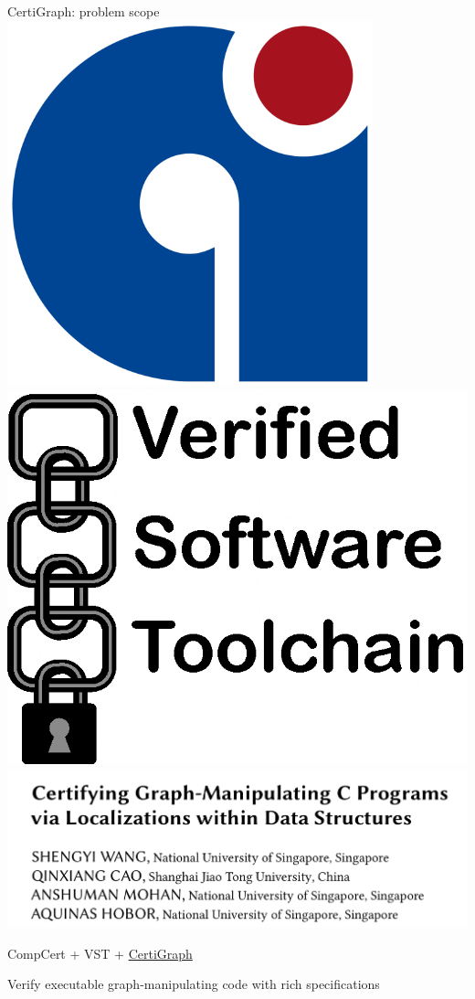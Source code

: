 \documentclass[usenames, xcolor=dvipsnames]{beamer}
\begin{document}
\begin{frame}{CertiGraph: problem scope}
\includegraphics[scale=0.12]{compcert_logo}
\hspace{2em} \includegraphics[scale=0.09]{vst_logo}
\hspace{2em} \includegraphics[scale=0.2]{paper_screen}

\bigskip
CompCert + VST + \underline{CertiGraph}

\bigskip

\pause

Verify executable graph-manipulating code with rich specifications

\end{frame}
\end{document}
